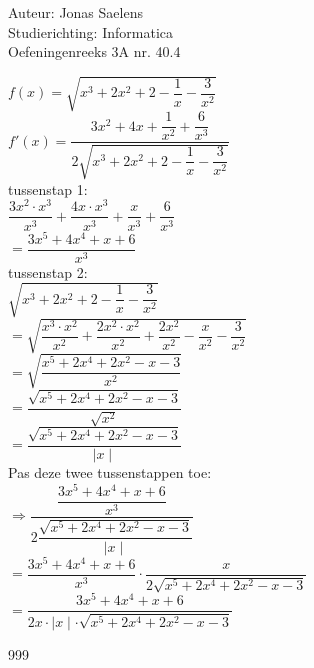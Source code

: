 \documentclass[a4paper]{article}
\begin{document}
\noindent \large Auteur: Jonas Saelens \\
\noindent \large Studierichting: Informatica\\
\noindent \large Oefeningenreeks 3A nr. 40.4\\

\medskip

\normalsize

$f(x)=\sqrt{x^3+2x^2+2-\dfrac{1}{x}-\dfrac{3}{x^2}}$ \\

$f'(x)=\dfrac{3x^2+4x+\dfrac{1}{x^2}+\dfrac{6}{x^3}}{2\sqrt{x^3+2x^2+2-\dfrac{1}{x}-\dfrac{3}{x^2}}}$ \\

tussenstap 1: \\

$\dfrac{3x^2 \cdot x^3}{x^3} + \dfrac{4x \cdot x^3}{x^3} + \dfrac{x}{x^3} + \dfrac{6}{x^3}$ \\

$= \dfrac{3x^5 + 4x^4 + x + 6}{x^3}$ \\

tussenstap 2: \\

$\sqrt{x^3+2x^2+2-\dfrac{1}{x}-\dfrac{3}{x^2}}$ \\

$= \sqrt{\dfrac{x^3 \cdot x^2}{x^2} + \dfrac{2x^2 \cdot x^2}{x^2} + \dfrac{2x^2}{x^2}-\dfrac{x}{x^2} - \dfrac{3}{x^2}}$ \\

$= \sqrt{\dfrac{x^5+2x^4+2x^2-x-3}{x^2}}$ \\

$= \dfrac{\sqrt{x^5+2x^4+2x^2-x-3}}{\sqrt{x^2}}$ \\

$= \dfrac{\sqrt{x^5+2x^4+2x^2-x-3}}{\mid x \mid}$ \\

Pas deze twee tussenstappen toe: \\

$\Rightarrow \dfrac{\dfrac{3x^5 + 4x^4 + x + 6}{x^3}}{2\dfrac{\sqrt{x^5+2x^4+2x^2-x-3}}{\mid x \mid}}$ \\

$= \dfrac{3x^5 + 4x^4 + x + 6}{x^3} \cdot \dfrac{x}{2\sqrt{x^5+2x^4+2x^2-x-3}}$ \\

$= \dfrac{3x^5 + 4x^4 + x + 6}{2x \cdot \mid x \mid \cdot \sqrt{x^5+2x^4+2x^2-x-3}}$ \\

\begin{thebibliography}{999}
\end{thebibliography}
\end{document}
